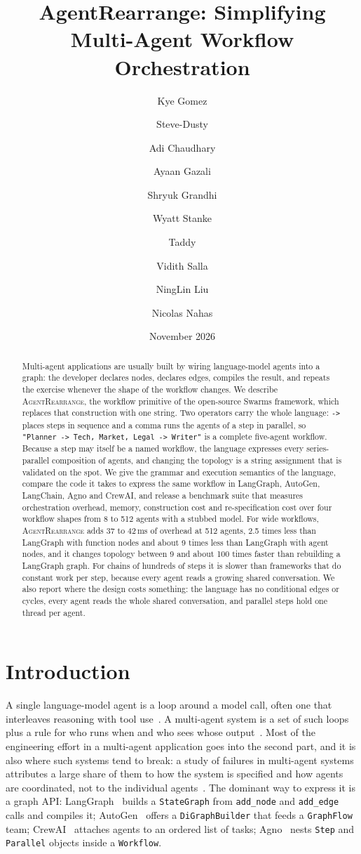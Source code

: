 \documentclass[11pt]{article}
\title{\textbf{AgentRearrange: Simplifying Multi-Agent Workflow Orchestration}}
\author{Kye Gomez}
\author{Steve-Dusty}
\author{Adi Chaudhary}
\author{Ayaan Gazali}
\author{Shryuk Grandhi}
\author{Wyatt Stanke}
\author{Taddy}
\author{Vidith Salla}
\author{NingLin Liu}
\author{Nicolas Nahas}
\affil{Swarms Corp\\ Correspondence: \href{mailto:kye@swarms.world}{kye@swarms.world}}
\date{November 2026}
\newcommand{\code}[1]{\texttt{#1}}
\newcommand{\AR}{\textsc{AgentRearrange}}
\begin{document}
\maketitle
\thispagestyle{paper}

\begin{abstract}
\noindent
Multi-agent applications are usually built by wiring language-model agents into a graph: the developer declares nodes, declares edges, compiles the result, and repeats the exercise whenever the shape of the workflow changes. We describe \AR{}, the workflow primitive of the open-source Swarms framework, which replaces that construction with one string. Two operators carry the whole language: \code{->} places steps in sequence and a comma runs the agents of a step in parallel, so \code{"Planner -> Tech, Market, Legal -> Writer"} is a complete five-agent workflow. Because a step may itself be a named workflow, the language expresses every series-parallel composition of agents, and changing the topology is a string assignment that is validated on the spot.
We give the grammar and execution semantics of the language, compare the code it takes to express the same workflow in LangGraph, AutoGen, LangChain, Agno and CrewAI, and release a benchmark suite that measures orchestration overhead, memory, construction cost and re-specification cost over four workflow shapes from 8 to 512 agents with a stubbed model. For wide workflows, \AR{} adds 37 to 42\,ms of overhead at 512 agents, 2.5 times less than LangGraph with function nodes and about 9 times less than LangGraph with agent nodes, and it changes topology between 9 and about 100 times faster than rebuilding a LangGraph graph. For chains of hundreds of steps it is slower than frameworks that do constant work per step, because every agent reads a growing shared conversation.
We also report where the design costs something: the language has no conditional edges or cycles, every agent reads the whole shared conversation, and parallel steps hold one thread per agent.
\end{abstract}

\section{Introduction}

A single language-model agent is a loop around a model call, often one that interleaves reasoning with tool use~\cite{react}. A multi-agent system is a set of such loops plus a rule for who runs when and who sees whose output~\cite{survey_guo,survey_wang}. Most of the engineering effort in a multi-agent application goes into the second part, and it is also where such systems tend to break: a study of failures in multi-agent systems attributes a large share of them to how the system is specified and how agents are coordinated, not to the individual agents~\cite{mast}. The dominant way to express it is a graph API: LangGraph~\cite{langgraph} builds a \code{StateGraph} from \code{add\_node} and \code{add\_edge} calls and compiles it; AutoGen~\cite{autogen} offers a \code{DiGraphBuilder} that feeds a \code{GraphFlow} team; CrewAI~\cite{crewai} attaches agents to an ordered list of tasks; Agno~\cite{agno} nests \code{Step} and \code{Parallel} objects inside a \code{Workflow}.
\end{document}
